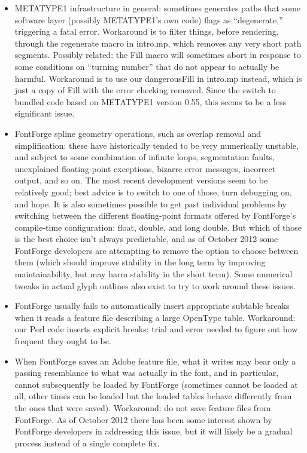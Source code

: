 \documentclass[14pt]{extarticle}
\begin{document}
\begin{itemize}
  \item METATYPE1 infrastructure in general: sometimes generates paths that
    some software layer (possibly METATYPE1's own code) flags as
    ``degenerate,'' triggering a fatal error.  Workaround is to filter
    things, before rendering, through the regenerate macro in intro.mp,
    which removes any very short path segments.  Possibly related: the Fill
    macro will sometimes abort in response to some conditions on ``turning
    number'' that do not appear to actually be harmful.  Workaround is to
    use our dangerousFill in intro.mp instead, which is just a copy of Fill
    with the error checking removed.  Since the switch to bundled code based
    on METATYPE1 version 0.55, this seems to be a less significant issue.

  \item FontForge spline geometry operations, such as overlap removal and
    simplification: these have historically tended to be very numerically
    unstable, and subject to some combination of infinite loops,
    segmentation faults, unexplained floating-point exceptions, bizarre
    error messages, incorrect output, and so on.  The most recent
    development versions seem to be relatively good; best advice is to
    switch to one of those, turn debugging on, and hope.  It is also
    sometimes possible to get past individual problems by switching between
    the different floating-point formats offered by FontForge's compile-time
    configuration: float, double, and long double.  But which of those is
    the best choice isn't always predictable, and as of October 2012 some
    FontForge developers are attempting to remove the option to choose
    between them (which should improve stability in the long term by
    improving maintainability, but may harm stability in the short term). 
    Some numerical tweaks in actual glyph outlines also exist to try to work
    around these issues.

  \item FontForge usually fails to automatically insert appropriate
    subtable breaks when it reads a feature file describing a large
    OpenType table.  Workaround:  our Perl code inserts explicit breaks;
    trial and error needed to figure out how frequent they ought to be.

  \item When FontForge saves an Adobe feature file, what it writes may bear
    only a passing resemblance to what was actually in the font, and in
    particular, cannot subsequently be loaded by FontForge (sometimes cannot
    be loaded at all, other times can be loaded but the loaded tables behave
    differently from the ones that were saved).  Workaround:  do not save
    feature files from FontForge.  As of October 2012 there has been some
    interest shown by FontForge developers in addressing this issue, but it
    will likely be a gradual process instead of a single complete fix.


\end{itemize}
\end{document}
